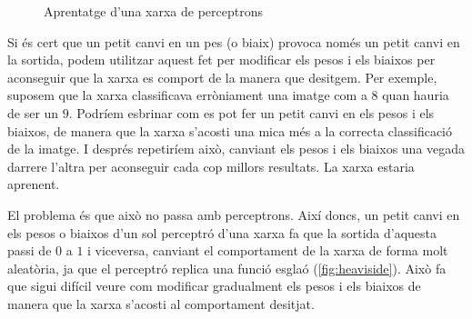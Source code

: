 \begin{refsection}
\begin{figure}[h]
		\caption{Aprentatge d'una xarxa de perceptrons}
		\label{fig:learn}
	\end{figure}

	Si és cert que un petit canvi en un pes (o biaix) provoca només un petit canvi en la sortida, podem utilitzar aquest fet per modificar els pesos i els biaixos per aconseguir que la xarxa es comport de la manera que desitgem. Per exemple, suposem que la xarxa classificava erròniament una imatge com a $8$ quan hauria de ser un $9$. Podríem esbrinar com es pot fer un petit canvi en els pesos i els biaixos, de manera que la xarxa s'acosti una mica més a la correcta classificació de la imatge. I després repetiríem això, canviant els pesos i els biaixos una vegada darrere l'altra per aconseguir cada cop millors resultats. La xarxa estaria aprenent.
	
	El problema és que això no passa amb perceptrons. Així doncs, un petit canvi en els pesos o biaixos d'un sol perceptró d'una xarxa fa que la sortida d'aquesta passi de $0$ a $1$ i viceversa, canviant el comportament de la xarxa de forma molt aleatòria, ja que el perceptró replica una funció esglaó (\cref{fig:heaviside}). Això fa que sigui difícil veure com modificar gradualment els pesos i els biaixos de manera que la xarxa s’acosti al comportament desitjat.
	

\end{refsection}
